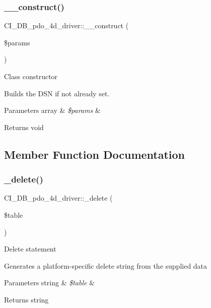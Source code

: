 \subsubsection{\texorpdfstring{\+\_\+\+\_\+construct()}{\_\_construct()}}
{\footnotesize\ttfamily C\+I\+\_\+\+D\+B\+\_\+pdo\+\_\+4d\+\_\+driver\+::\+\_\+\+\_\+construct (\begin{DoxyParamCaption}\item[{}]{\$params }\end{DoxyParamCaption})}

Class constructor

Builds the D\+SN if not already set.


\begin{DoxyParams}[1]{Parameters}
array & {\em \$params} & \\
\hline
\end{DoxyParams}
\begin{DoxyReturn}{Returns}
void 
\end{DoxyReturn}


\subsection{Member Function Documentation}
\mbox{\label{class_c_i___d_b__pdo__4d__driver_aa4dc675f50b8bc3c59e65b66b085b3ab}} 
\subsubsection{\texorpdfstring{\+\_\+delete()}{\_delete()}}
{\footnotesize\ttfamily C\+I\+\_\+\+D\+B\+\_\+pdo\+\_\+4d\+\_\+driver\+::\+\_\+delete (\begin{DoxyParamCaption}\item[{}]{\$table }\end{DoxyParamCaption})\hspace{0.3cm}{\ttfamily [protected]}}

Delete statement

Generates a platform-\/specific delete string from the supplied data


\begin{DoxyParams}[1]{Parameters}
string & {\em \$table} & \\
\hline
\end{DoxyParams}
\begin{DoxyReturn}{Returns}
string 
\end{DoxyReturn}
\mbox{\label{class_c_i___d_b__pdo__4d__driver_a00fd55ed37117db3b9a3de70d64fc8b4}} 

